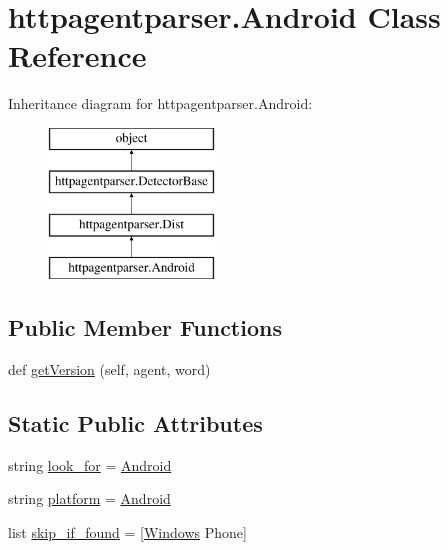 \hypertarget{classhttpagentparser_1_1_android}{}\section{httpagentparser.\+Android Class Reference}
\label{classhttpagentparser_1_1_android}
Inheritance diagram for httpagentparser.\+Android\+:\begin{figure}[H]
\begin{center}
\leavevmode
\includegraphics[height=4.000000cm]{classhttpagentparser_1_1_android}
\end{center}
\end{figure}
\subsection*{Public Member Functions}
\begin{DoxyCompactItemize}
\item 
def \hyperlink{classhttpagentparser_1_1_android_a4bf3823189b36eae15473f8d5e3983c8}{get\+Version} (self, agent, word)
\end{DoxyCompactItemize}
\subsection*{Static Public Attributes}
\begin{DoxyCompactItemize}
\item 
string \hyperlink{classhttpagentparser_1_1_android_afc7fdd2a13c7b286ef7f5a92f8c490d3}{look\+\_\+for} = \textquotesingle{}\hyperlink{classhttpagentparser_1_1_android}{Android}\textquotesingle{}
\item 
string \hyperlink{classhttpagentparser_1_1_android_a1200228e7e9cdbcae82e97c81652c1d5}{platform} = \textquotesingle{}\hyperlink{classhttpagentparser_1_1_android}{Android}\textquotesingle{}
\item 
list \hyperlink{classhttpagentparser_1_1_android_a4e89d0aa94d60f110c32d7ca5cb4f943}{skip\+\_\+if\+\_\+found} = \mbox{[}\textquotesingle{}\hyperlink{classhttpagentparser_1_1_windows}{Windows} Phone\textquotesingle{}\mbox{]}
\end{DoxyCompactItemize}
